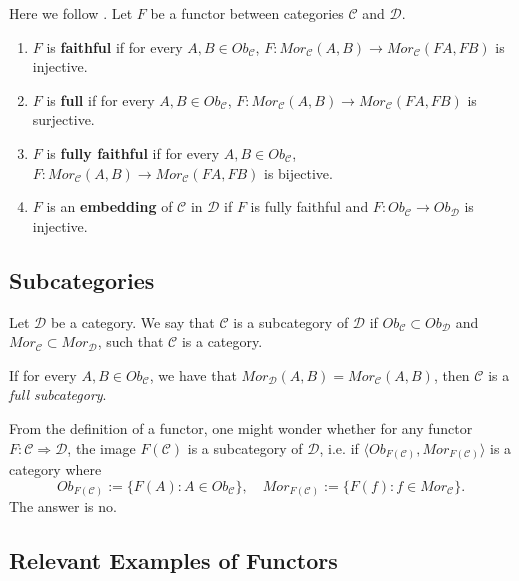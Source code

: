 \begin{definition}
	Here we follow \citet{roman2017introduction}.
	Let $F$ be a functor between categories $\mathcal C$ and $\mathcal D$.
	\begin{enumerate}[1.]
		\item $F$ is \textbf{faithful} if for every $A,B \in Ob_\mathcal C$,
		      $F:Mor_\mathcal C(A,B)\to Mor_\mathcal C(FA,FB)$ is injective.
		\item $F$ is \textbf{full} if for every $A,B \in Ob_\mathcal C$,
		      $F:Mor_\mathcal C(A,B)\to Mor_\mathcal C(FA,FB)$ is surjective.
		\item $F$ is \textbf{fully faithful} if for every $A,B \in Ob_\mathcal C$,
		      $F:Mor_\mathcal C(A,B)\to Mor_\mathcal C(FA,FB)$ is bijective.
		\item $F$ is an \textbf{embedding} of $\mathcal C$ in $\mathcal D$ if $F$ is fully faithful
		      and $F:Ob_\mathcal C \to Ob_\mathcal D$ is injective.
	\end{enumerate}

\end{definition}

\subsection{Subcategories}

\begin{definition}[Subcategory]
	Let $\mathcal D$ be a category. We say that $\mathcal C$
	is a subcategory of $\mathcal D$ if $Ob_\mathcal C \subset Ob_\mathcal D$ and
	$Mor_\mathcal C \subset Mor_\mathcal D$, such that $\mathcal C$ is a category.

	If for every $A, B \in Ob_\mathcal C$, we have that $Mor_\mathcal D (A,B) = Mor_\mathcal C(A,B)$,
	then $\mathcal C$ is a \textit{full subcategory}.
\end{definition}

From the definition of a functor, one might wonder whether for any
functor $F:\mathcal C \Rightarrow \mathcal D$,
the image $F(\mathcal C)$ is a subcategory of $\mathcal D$, i.e.
if $\langle Ob_{F(\mathcal C)}, Mor_{F(\mathcal C)} \rangle$ is a category where
\begin{displaymath}
	Ob_{F(\mathcal C)}:= \{F(A) : A \in Ob_\mathcal C\}, \quad
	Mor_{F(\mathcal C)}:= \{F(f) : f \in Mor_\mathcal C\}.
\end{displaymath}
The answer is no.

\subsection{Relevant Examples of Functors}

